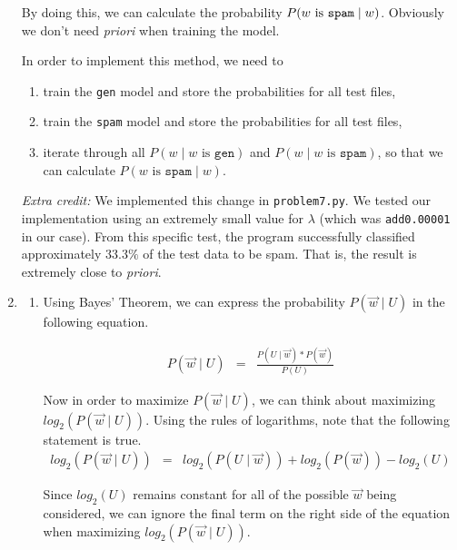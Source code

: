 \documentclass[11pt]{article}
\begin{document}
\begin{enumerate}
	By doing this, we can calculate the probability $P(w \text{ is \texttt{spam}} \mid w)$. Obviously we don't need \textit{priori} when training the model.

	In order to implement this method, we need to
	\begin{enumerate}[label=\roman*.]
		\item
			train the \texttt{gen} model and store the probabilities for all test files,
		\item
			train the \texttt{spam} model and store the probabilities for all test files,
		\item
			iterate through all $P(w \mid w \text{ is } \texttt{gen})$ and $P(w \mid w \text{ is } \texttt{spam})$, so that we can calculate $P(w \text{ is } \texttt{spam} \mid w)$.

	\end{enumerate}

	\textit{Extra credit:} We implemented this change in \texttt{problem7.py}. We tested our implementation using an extremely small value for $\lambda$ (which was \texttt{add0.00001} in our case). From this specific test, the program successfully classified approximately $33.3\%$ of the test data to be spam. That is, the result is extremely close to \textit{priori}.

\item %
	\begin{enumerate}[label=(\alph*)]
	\item
		Using Bayes’ Theorem, we can express the probability $P(\vec{w} \mid U)$ in the following equation.

		\begin{eqnarray*}
			P(\vec{w} \mid U) &=& \frac{P(U \mid \vec{w}) * P(\vec{w})}{P(U)}
		\end{eqnarray*}

		Now in order to maximize $P(\vec{w} \mid U)$, we can think about maximizing $log_2(P(\vec{w} \mid U))$. Using the rules of logarithms, note that the following statement is true.
		\begin{eqnarray*}
			log_2(P(\vec{w} \mid U)) &=& log_2(P(U \mid \vec{w})) + log_2(P(\vec{w})) - log_2(U)
		\end{eqnarray*}

		Since $log_2(U)$ remains constant for all of the possible $\vec{w}$ being considered, we can ignore the final term on the right side of the equation when maximizing $log_2(P(\vec{w} \mid U))$. \vspace{4pt}


\end{enumerate}
\end{enumerate}
\end{document}
